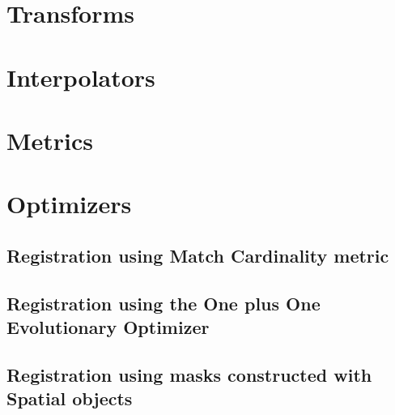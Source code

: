 \section{Transforms}
\label{sec:Transforms}
\ifitkFullVersion

\fi



\clearpage

\section{Interpolators}
\label{sec:Interpolators}
\ifitkFullVersion

\fi

\clearpage

\section{Metrics}
\label{sec:Metrics}
\ifitkFullVersion

\fi

\clearpage

\section{Optimizers}
\label{sec:Optimizers}
\ifitkFullVersion

\fi



\subsection{Registration using Match Cardinality metric}
\label{sec:RegistrationMatchCardinality}
\ifitkFullVersion

\fi


\subsection{Registration using the One plus One Evolutionary Optimizer}
\label{sec:RegistrationOnePlusOne}
\ifitkFullVersion

\fi



\subsection{Registration using masks constructed with Spatial objects}
\label{sec:RegistrationSpatialObjects}
\ifitkFullVersion

\fi



